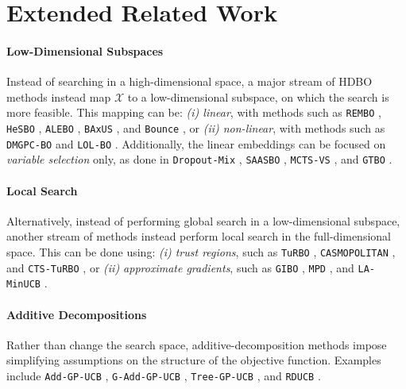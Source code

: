 \documentclass[twoside]{article}
\theoremstyle{plain}
\theoremstyle{definition}
\begin{document}
\section{Extended Related Work} \label{app:hdbo}
\paragraph{Low-Dimensional Subspaces}
Instead of searching in a high-dimensional space, a major stream of HDBO methods instead map $\mathcal{X}$ to a low-dimensional subspace, on which the search is more feasible. This mapping can be: \textit{(i) linear}, with methods such as \texttt{REMBO} \citep{wang2016bayesian}, \texttt{HeSBO} \citep{nayebi2019framework}, \texttt{ALEBO} \citep{letham2020re}, \texttt{BAxUS} \citep{papenmeier2022increasing}, and \texttt{Bounce}  \citep{papenmeier2023bounce}, or \textit{(ii) non-linear}, with methods such as \texttt{DMGPC-BO} \citep{moriconi2020high} and \texttt{LOL-BO} \citep{maus2022local}. Additionally, the linear embeddings can be focused on \textit{variable selection} only, as done in \texttt{Dropout-Mix} \citep{li2017high}, \texttt{SAASBO} \citep{eriksson2021high}, \texttt{MCTS-VS} \citep{song2022monte}, and \texttt{GTBO} \citep{hellsten2025leveraging}.

\paragraph{Local Search} Alternatively, instead of performing global search in a low-dimensional subspace, another stream of methods instead perform local search in the full-dimensional space. This can be done using: \textit{(i) trust regions}, such as \texttt{TuRBO} \citep{eriksson2019scalable}, \texttt{CASMOPOLITAN} \citep{wan2021think}, and \texttt{CTS-TuRBO} \citep{rashidi2024cylindrical}, or \textit{(ii) approximate gradients}, such as \texttt{GIBO} \citep{muller2021local, wu2023behavior}, \texttt{MPD} \citep{nguyen2022local}, and \texttt{LA-MinUCB} \citep{fan2024minimizing}.

\paragraph{Additive Decompositions} Rather than change the search space, additive-decomposition methods impose simplifying assumptions on the structure of the objective function. Examples include \texttt{Add-GP-UCB} \citep{kandasamy2015high}, \texttt{G-Add-GP-UCB} \citep{rolland2018high}, \texttt{Tree-GP-UCB} \citep{han2021high}, and \texttt{RDUCB} \citep{ziomek2023random}.
\end{document}
